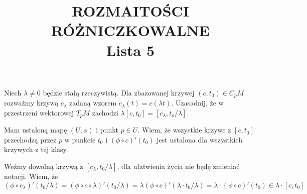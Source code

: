 \documentclass{article}
\title{ROZMAITOŚCI RÓŻNICZKOWALNE\\{\normalsize Lista 5}}
\author{}
\date{}
\begin{document}
\maketitle\thispagestyle{empty}

\begin{problem}[]{}
  Niech $\lambda\neq0$ będzie stałą rzeczywistą. Dla zbazowanej krzywej $(c, t_0)\in C_pM$ rozważmy krzywą $c_\lambda$ zadaną wzorem $c_\lambda(t)=c(\lambda t)$. Uzasadnij, że w przestrzeni wektorowej $T_pM$ zachodzi $\lambda[c, t_0]=[c_\lambda, t_o/\lambda]$.
\end{problem}


Mam ustaloną mapę $(U, \phi)$ i punkt $p\in U$. Wiem, że wszystkie krzywe z $[c, t_0]$ przechodzą przez $p$ w punkcie $t_0$ i $(\phi\circ c)'(t_0)$ jest ustalona dla wszystkich krzywych z tej klasy.

Weźmy dowolną krzywą z $[c_\lambda, t_0/\lambda]$, dla ułatwienia życia nie będę zmieniać notacji. Wiem, że 
$$(\phi\circ c_\lambda)'(t_0/\lambda)=(\phi\circ c\circ\lambda)'(t_0/\lambda)=\lambda(\phi\circ c)'(\lambda \cdot t_0/\lambda)=\lambda\cdot(\phi\circ c)'(t_0)\in\lambda\cdot[c, t_0]$$
\end{document}
